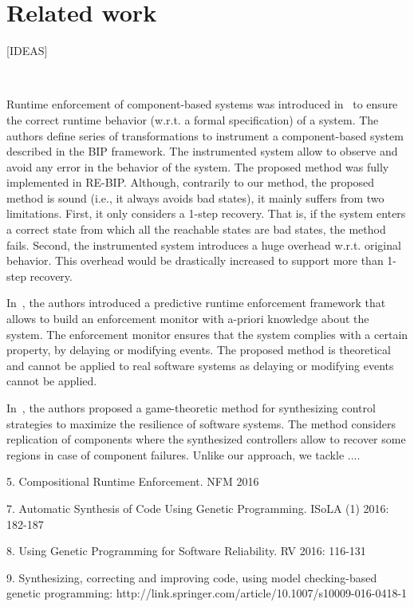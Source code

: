 \section{Related work}
[IDEAS]

~


Runtime enforcement of component-based systems was introduced in~\cite{CharafeddineEFJ15} to ensure the correct runtime behavior (w.r.t. a formal specification) of a system. 
The authors define series of transformations to instrument a component-based system described in the BIP framework. The instrumented system allow to observe and avoid any error in the behavior of the system. 
The proposed method was fully implemented in RE-BIP. 
Although, contrarily to our method, the proposed method is sound (i.e., it always avoids bad states), it mainly suffers from two limitations. First, it only considers a 1-step recovery. That is, if the system enters a correct state from which all the reachable states are bad states, the method fails.  Second, the instrumented system introduces a huge overhead w.r.t. original behavior. This overhead would be drastically increased to support more than 1-step recovery. 

In~\cite{PinisettyPTJFM16}, the authors introduced a predictive runtime enforcement framework that allows to build an enforcement monitor with a-priori knowledge about the system. The enforcement monitor ensures that the system complies with a certain property, by delaying or modifying events. The proposed method is theoretical and cannot be applied to real software systems as delaying or modifying events cannot be applied.

 

In~\cite{HuangPSW16}, the authors proposed a game-theoretic method for synthesizing control strategies to maximize the resilience of software systems. The method considers replication of components where the synthesized controllers allow to recover some regions in case of component failures. 
Unlike our approach, we tackle  ....

5. Compositional Runtime Enforcement. NFM 2016


7. Automatic Synthesis of Code Using Genetic Programming. ISoLA (1) 2016: 182-187


8. Using Genetic Programming for Software Reliability. RV 2016: 116-131



9. Synthesizing, correcting and improving code, using model checking-based genetic programming: http://link.springer.com/article/10.1007/s10009-016-0418-1





